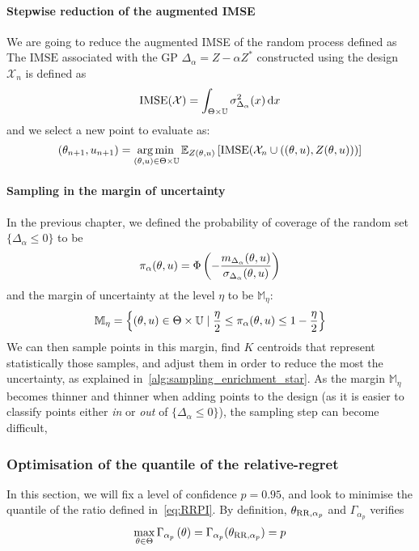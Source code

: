 \documentclass[../../Main_ManuscritThese.tex]{subfiles}
\begin{document}
\paragraph{Stepwise reduction of the augmented IMSE}
We are going to reduce the augmented IMSE of the random process
defined as The $\mathrm{IMSE}$ associated with the GP
$\Delta_{\alpha}=Z-\alpha Z^*$ constructed using the design
$\mathcal{X}_n$ is defined as
\begin{equation}
  \operatorname{\mathrm{IMSE}}(\mathcal{X}) = \int_{\Theta \times \mathbb{U}} \sigma^2_{\Delta_{\alpha}}(x) \,\mathrm{d}x
\end{equation}
and we select a new point to evaluate as:
\begin{equation}
  (\theta_{n+1}, u_{n+1}) = \operatorname*{arg\,min \,}_{(\theta,u)\in\Theta\times \mathbb{U}} \mathbb{E}_{Z(\theta, u)}\left[\operatorname{\mathrm{IMSE}}(\mathcal{X}_n \cup \left((\theta, u), Z(\theta, u)\right))\right]
\end{equation}

\paragraph{Sampling in the margin of uncertainty}
In the previous chapter, we defined the probability of coverage of the
random set $\{\Delta_\alpha \leq 0\}$ to be
\begin{equation}
  \pi_{\alpha}(\theta, u) = \Phi\left(-\frac{m_{\Delta_{\alpha}}(\theta, u)}{\sigma_{\Delta_\alpha}(\theta, u)}\right)
  \end{equation}
  and the margin of uncertainty at the level $\eta$ to be $\mathbb{M}_{\eta}$:
  \begin{equation}
    \mathbb{M}_{\eta} = \left\{(\theta, u)\in \Theta \times \mathbb{U} \mid \frac{\eta}{2} \leq \pi_{\alpha}(\theta, u) \leq 1-\frac{\eta}{2}\right\}
  \end{equation}
  We can then sample points in this margin, find $K$ centroids that
  represent statistically those samples, and adjust them in order to
  reduce the most the uncertainty, as explained
  in~\cref{alg:sampling_enrichment_star}.  As the margin
  $\mathbb{M}_{\eta}$ becomes thinner and thinner when adding points
  to the design (as it is easier to classify points either \emph{in}
  or \emph{out} of $\{\Delta_{\alpha} \leq 0\}$), the sampling step
  can become difficult,
\subsubsection{Optimisation of the quantile of the relative-regret}
In this section, we will fix a level of confidence $p=0.95$, and look
to minimise the quantile of the ratio defined in~\cref{eq:RRPI}.  By
definition, $\theta_{\mathrm{RR},\alpha_p}$ and $\Gamma_{\alpha_p}$
verifies
\begin{equation}
\max_{\theta\in\Theta}  \Gamma_{\alpha_p}\left(\theta\right) = \Gamma_{\alpha_p}(\theta_{\mathrm{RR}, \alpha_p}) = p
\end{equation}
\end{document}
